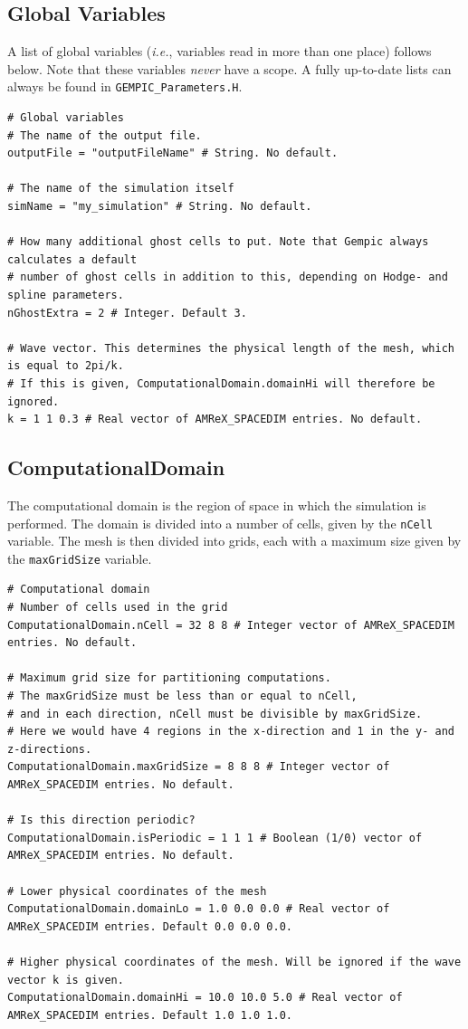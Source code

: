 \documentclass[11pt]{article}
\begin{document}
\subsection{Global Variables}
A list of global variables (\emph{i.e.}, variables read in more than one place) follows below. Note that these variables \emph{never} have a scope. A fully up-to-date lists can always be found in \verb|GEMPIC_Parameters.H|.
\begin{lstlisting}[language=pkgconfig]
# Global variables
# The name of the output file.
outputFile = "outputFileName" # String. No default.

# The name of the simulation itself
simName = "my_simulation" # String. No default.

# How many additional ghost cells to put. Note that Gempic always calculates a default
# number of ghost cells in addition to this, depending on Hodge- and spline parameters.
nGhostExtra = 2 # Integer. Default 3.

# Wave vector. This determines the physical length of the mesh, which is equal to 2pi/k.
# If this is given, ComputationalDomain.domainHi will therefore be ignored.
k = 1 1 0.3 # Real vector of AMReX_SPACEDIM entries. No default.
\end{lstlisting}

\subsection{ComputationalDomain}
The computational domain is the region of space in which the simulation is performed. The domain is divided into a number of cells, given by the \verb|nCell| variable. The mesh is then divided into grids, each with a maximum size given by the \verb|maxGridSize| variable.

\begin{lstlisting}[language=pkgconfig]
# Computational domain
# Number of cells used in the grid
ComputationalDomain.nCell = 32 8 8 # Integer vector of AMReX_SPACEDIM entries. No default.

# Maximum grid size for partitioning computations. 
# The maxGridSize must be less than or equal to nCell,
# and in each direction, nCell must be divisible by maxGridSize.
# Here we would have 4 regions in the x-direction and 1 in the y- and z-directions.
ComputationalDomain.maxGridSize = 8 8 8 # Integer vector of AMReX_SPACEDIM entries. No default.

# Is this direction periodic?
ComputationalDomain.isPeriodic = 1 1 1 # Boolean (1/0) vector of AMReX_SPACEDIM entries. No default.

# Lower physical coordinates of the mesh
ComputationalDomain.domainLo = 1.0 0.0 0.0 # Real vector of AMReX_SPACEDIM entries. Default 0.0 0.0 0.0.

# Higher physical coordinates of the mesh. Will be ignored if the wave vector k is given.
ComputationalDomain.domainHi = 10.0 10.0 5.0 # Real vector of AMReX_SPACEDIM entries. Default 1.0 1.0 1.0.
\end{lstlisting}
\end{document}
